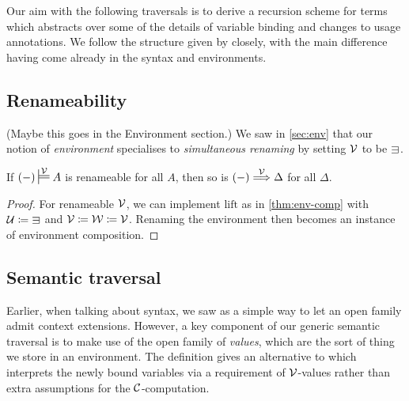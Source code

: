Our aim with the following traversals is to derive a recursion scheme for
terms which abstracts over some of the details of variable binding and
changes to usage annotations.
We follow the structure given by \citet{AACMM20} closely, with
the main difference having come already in the syntax and environments.

\subsection{Renameability}

{\color{red}(Maybe this goes in the Environment section.)}
We saw in \cref{sec:env} that our notion of \emph{environment} specialises to
\emph{simultaneous renaming} by setting $\V$ to be $\sqni$.


\begin{lemma}\label{thm:env-ren}
  If $\plr{-} \sdtstile{}\V A$ is renameable for all $A$, then so is
  $\plr{-} \env\V \Delta$ for all $\Delta$.
\end{lemma}
\begin{proof}
  For renameable $\V$, we can implement $\mathrm{lift}$ as in
  \cref{thm:env-comp} with $\U \coloneqq {\sqni}$ and
  $\mathcal V \coloneqq \mathcal W \coloneqq \mathcal V$.
  Renaming the environment then becomes an instance of environment composition.
\end{proof}

\subsection{Semantic traversal}

Earlier, when talking about syntax, we saw  as a simple way
to let an open family admit context extensions.
However, a key component of our generic semantic traversal is to make use of
the open family \AgdaBound{$\V$} of \emph{values}, which are the sort of thing
we store in an environment.
The definition  gives an alternative to
 which interprets the newly bound variables via a
requirement of $\V$-values rather than extra assumptions for the
$\mathcal C$-computation.



